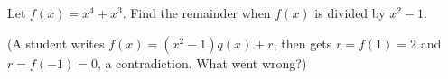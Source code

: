 Let $f(x)=x^4+x^3$. Find the remainder when $f(x)$ is divided by $x^2-1$.

(A student writes $f(x)=(x^2-1)q(x)+r$, then gets $r=f(1)=2$ and $r=f(-1)=0$, a contradiction. What went wrong?)

